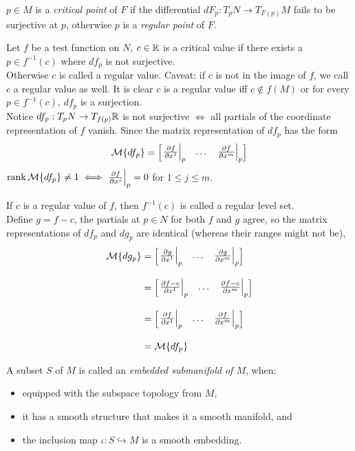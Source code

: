 \documentclass[../main-manifolds.tex]{subfiles}
\begin{document}
\begin{definition}
    $p\in M$ is a \emph{critical point} of $F$ if the differential $dF_p:T_pN\to T_{F(p)}M$ fails to be surjective at $p$, otherwise $p$ is a \emph{regular point} of $F$.
\end{definition}
\begin{definition}
    Let $f$ be a test function on $N$, $c\in\mathbb{R}$ is a critical value if there exists a $p\in f^{-1}(c)$ where $df_p$ is not surjective.\\

    Otherwise $c$ is called a regular value. Caveat: if $c$ is not in the image of $f$, we call $c$ a regular value as well. It is clear $c$ is a regular value iff $c\notin f(M)$ or for every $p\in f^{-1}(c)$, $df_p$ is a surjection.\\

    Notice $df_p: T_pN\to T_{f(p)}\mathbb{R}$ is not surjective $\iff$ all partials of the coordinate representation of $f$ vanish. Since the matrix representation of $df_p$ has the form
    \[
        \mcal\{df_p\}=\mqty[\eval{\pdv{f}{x^1}}_{p} & \ldots & \eval{\pdv{f}{x^m}}_{p}]
    \]
    $\rank\mcal\{df_p\}\neq 1 \iff \eval{\pdv{f}{x^j}}_{p}=0$ for $1\leq j\leq m$.
\end{definition}
\begin{definition}
    If $c$ is a regular value of $f$, then $f^{-1}(c)$ is called a regular level set.\\

    Define $g = f-c$, the partials at $p\in N$ for both $f$ and $g$ agree, so the matrix representations of $df_p$ and $dg_p$ are identical (whereas their ranges might not be),
    \begin{align*}
        \mcal\{dg_p\}&=\mqty[\eval{\pdv{g}{x^1}}_{p} & \ldots & \eval{\pdv{g}{x^m}}_{p}]\\[2ex]
        &=\mqty[\eval{\pdv{f-c}{x^1}}_{p} & \ldots & \eval{\pdv{f-c}{x^m}}_{p}]\\[2ex]
        &=\mqty[\eval{\pdv{f}{x^1}}_{p} & \ldots & \eval{\pdv{f}{x^m}}_{p}]\\[2ex]
        &= \mcal\{df_p\}
    \end{align*}
\end{definition}

\begin{definition}\label{lee-chp5:embedded-submanifold}
    A subset $S$ of $M$ is called an \emph{embedded submanifold of $M$}, when:
    \begin{itemize}
        \item equipped with the subspace topology from $M$,
        \item it has a smooth structure that makes it a smooth manifold, and
        \item the inclusion map $\iota: S\hookrightarrow M$ is a smooth embedding.
    \end{itemize}
\end{definition}
\end{document}
